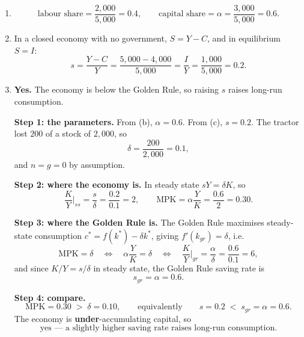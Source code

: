 \documentclass[12pt, letterpaper]{article}
\newcommand{\MPK}{\mathrm{MPK}}
\newcommand{\stst}{^{\ast}}
\begin{document}
\begin{tcolorbox}[evenbox,title={Problem 5.8 \quad National Accounts and The Golden Rule}]
\begin{enumerate}
\begin{tcolorbox}[trapbox]
The wheat and the combine harvester cost the same $1{,}000$ Denarii and are treated in
opposite ways. The test is not the price and not the buyer --- both are bought by firms ---
but whether the good \emph{survives the period}. Wheat is consumed in production this year
(intermediate, netted out); a harvester is used for years (capital, counted as investment).
Netting out the harvester would give GDP $=4{,}000$; counting the wheat would give
$6{,}000$. Only $5{,}000$ makes the three methods agree.
\end{tcolorbox}

\item
\[
\text{labour share}=\frac{2{,}000}{5{,}000}=\boxed{0.4},
\qquad
\text{capital share}=\alpha=\frac{3{,}000}{5{,}000}=\boxed{0.6} .
\]

\item In a closed economy with no government, $S=Y-C$, and in equilibrium $S=I$:
\[
s=\frac{Y-C}{Y}=\frac{5{,}000-4{,}000}{5{,}000}=\frac{I}{Y}=\frac{1{,}000}{5{,}000}
=\boxed{0.2} .
\]

\item \textbf{Yes.} The economy is below the Golden Rule, so raising $s$ raises long-run
consumption.

\smallskip
\textbf{Step 1: the parameters.} From (b), $\alpha=0.6$. From (c), $s=0.2$. The tractor lost
$200$ of a stock of $2{,}000$, so
\[
\delta=\frac{200}{2{,}000}=0.1 ,
\]
and $n=g=0$ by assumption.

\smallskip
\textbf{Step 2: where the economy is.} In steady state $sY=\delta K$, so
\[
\frac{K}{Y}\bigg|_{ss}=\frac{s}{\delta}=\frac{0.2}{0.1}=2,
\qquad
\MPK=\alpha\frac{Y}{K}=\frac{0.6}{2}=0.30 .
\]

\smallskip
\textbf{Step 3: where the Golden Rule is.} The Golden Rule maximises steady-state
consumption $c\stst=f(k\stst)-\delta k\stst$, giving $f'(k_{gr})=\delta$, i.e.
\[
\MPK=\delta
\quad\Longleftrightarrow\quad
\alpha\frac{Y}{K}=\delta
\quad\Longleftrightarrow\quad
\frac{K}{Y}\bigg|_{gr}=\frac{\alpha}{\delta}=\frac{0.6}{0.1}=6 ,
\]
and since $K/Y=s/\delta$ in steady state, the Golden Rule saving rate is
\[
s_{gr}=\alpha=0.6 .
\tag{5.8.1}
\]

\smallskip
\textbf{Step 4: compare.}
\[
\MPK=0.30 \;>\; \delta=0.10,
\qquad\text{equivalently}\qquad
s=0.2 \;<\; s_{gr}=\alpha=0.6 .
\]
The economy is \textbf{under}-accumulating capital, so
\[
\boxed{\text{yes --- a slightly higher saving rate raises long-run consumption.}}
\]


\end{enumerate}
\end{tcolorbox}
\end{document}
